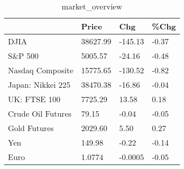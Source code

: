 \documentclass{article}%
\begin{document}
%


\begin{table}[htbp]%
\caption{market\_overview}%
\centering%
\begin{adjustbox}{width=1\textwidth}%
\begin{tabular}{llll}
\toprule
                  &    Price &     Chg &  \%Chg \\
\midrule
             DJIA & 38627.99 & -145.13 & -0.37 \\
          S\&P 500 &  5005.57 &  -24.16 & -0.48 \\
 Nasdaq Composite & 15775.65 & -130.52 & -0.82 \\
Japan: Nikkei 225 & 38470.38 &  -16.86 & -0.04 \\
     UK: FTSE 100 &  7725.29 &   13.58 &  0.18 \\
Crude Oil Futures &    79.15 &   -0.04 & -0.05 \\
     Gold Futures &  2029.60 &    5.50 &  0.27 \\
              Yen &   149.98 &   -0.22 & -0.14 \\
             Euro &   1.0774 & -0.0005 & -0.05 \\
\bottomrule
\end{tabular}
%
\end{adjustbox}%
\end{table}

%
\end{document}
